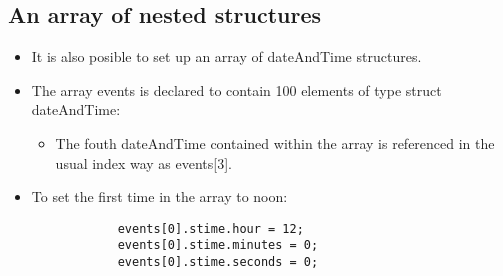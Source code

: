 \subsection{An array of nested structures}
\begin{itemize}
    \item It is also posible to set up an array of dateAndTime structures.
    
    \item The array events is declared to contain 100 elements of type struct dateAndTime:
        \begin{itemize}
            \item The fouth dateAndTime contained within the array is referenced in the usual index way as events[3].
        \end{itemize}
    
    \item To set the first time in the array to noon:
        \begin{verbatim}
            events[0].stime.hour = 12;
            events[0].stime.minutes = 0;
            events[0].stime.seconds = 0;
        \end{verbatim}
\end{itemize}

